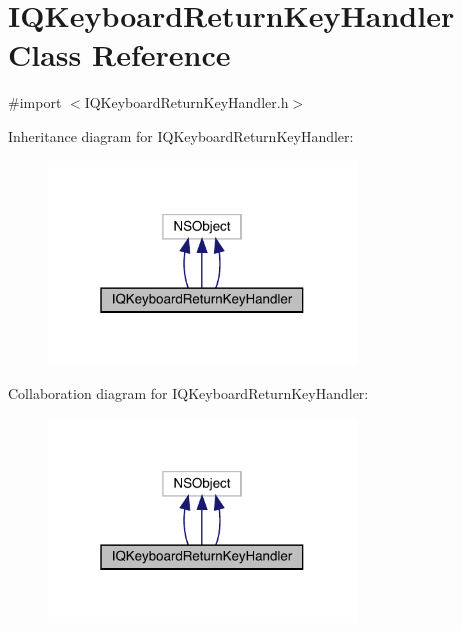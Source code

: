 \hypertarget{interface_i_q_keyboard_return_key_handler}{}\section{I\+Q\+Keyboard\+Return\+Key\+Handler Class Reference}
\label{interface_i_q_keyboard_return_key_handler}


{\ttfamily \#import $<$I\+Q\+Keyboard\+Return\+Key\+Handler.\+h$>$}



Inheritance diagram for I\+Q\+Keyboard\+Return\+Key\+Handler\+:\nopagebreak
\begin{figure}[H]
\begin{center}
\leavevmode
\includegraphics[width=232pt]{interface_i_q_keyboard_return_key_handler__inherit__graph}
\end{center}
\end{figure}


Collaboration diagram for I\+Q\+Keyboard\+Return\+Key\+Handler\+:\nopagebreak
\begin{figure}[H]
\begin{center}
\leavevmode
\includegraphics[width=232pt]{interface_i_q_keyboard_return_key_handler__coll__graph}
\end{center}
\end{figure}
